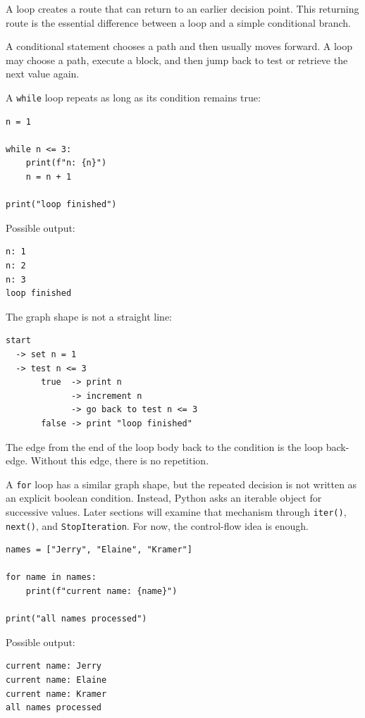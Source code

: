\documentclass[a4paper,twoside]{report}
\begin{document}
A loop creates a route that can return to an earlier decision point. This returning route is the essential difference between a loop and a simple conditional branch.

A conditional statement chooses a path and then usually moves forward. A loop may choose a path, execute a block, and then jump back to test or retrieve the next value again.

A \texttt{while} loop repeats as long as its condition remains true:

\begin{verbatim}
n = 1

while n <= 3:
    print(f"n: {n}")
    n = n + 1

print("loop finished")
\end{verbatim}

Possible output:

\begin{verbatim}
n: 1
n: 2
n: 3
loop finished
\end{verbatim}

The graph shape is not a straight line:

\begin{verbatim}
start
  -> set n = 1
  -> test n <= 3
       true  -> print n
             -> increment n
             -> go back to test n <= 3
       false -> print "loop finished"
\end{verbatim}

The edge from the end of the loop body back to the condition is the loop back-edge. Without this edge, there is no repetition.

A \texttt{for} loop has a similar graph shape, but the repeated decision is not written as an explicit boolean condition. Instead, Python asks an iterable object for successive values. Later sections will examine that mechanism through \texttt{iter()}, \texttt{next()}, and \texttt{StopIteration}. For now, the control-flow idea is enough.

\begin{verbatim}
names = ["Jerry", "Elaine", "Kramer"]

for name in names:
    print(f"current name: {name}")

print("all names processed")
\end{verbatim}

Possible output:

\begin{verbatim}
current name: Jerry
current name: Elaine
current name: Kramer
all names processed
\end{verbatim}
\end{document}
